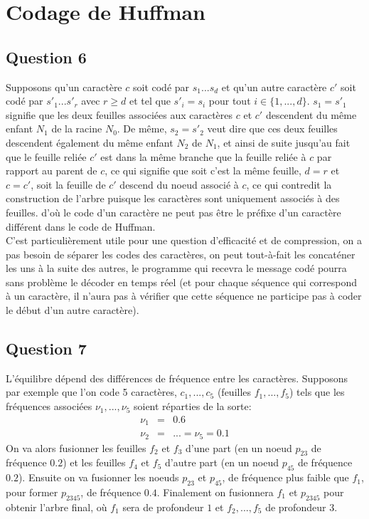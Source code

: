\documentclass{article}
\begin{document}
\section*{Codage de Huffman}
\subsection*{Question 6}
Supposons qu'un caractère $c$ soit codé par $s_1...s_d$ et qu'un autre caractère $c'$ soit codé par $s'_1...s'_r$ avec $r\geq d$ et tel que $s'_i = s_i$ pour tout $i \in \{1, ..., d\}$. $s_1 = s'_1$ signifie que les deux feuilles associées aux caractères $c$ et $c'$ descendent du même enfant $N_1$ de la racine $N_0$. De même, $s_2 = s'_2$ veut dire que ces deux feuilles descendent également du même enfant $N_2$ de $N_1$, et ainsi de suite jusqu'au fait que le feuille reliée $c'$ est dans la même branche que la feuille reliée à $c$ par rapport au parent de $c$, ce qui signifie que soit c'est la même feuille, $d=r$ et $c=c'$, soit la feuille de $c'$ descend du noeud associé à $c$, ce qui contredit la construction de l'arbre puisque les caractères sont uniquement associés à des feuilles. d'où le code d'un caractère ne peut pas être le préfixe d'un caractère différent dans le code de Huffman.\\
C'est particulièrement utile pour une question d'efficacité et de compression, on a pas besoin de séparer les codes des caractères, on peut tout-à-fait les concaténer les uns à la suite des autres, le programme qui recevra le message codé pourra sans problème le décoder en temps réel (et pour chaque séquence qui correspond à un caractère, il n'aura pas à vérifier que cette séquence ne participe pas à coder le début d'un autre caractère).

\subsection*{Question 7}
L'équilibre dépend des différences de fréquence entre les caractères. Supposons par exemple que l'on code 5 caractères, $c_1, ..., c_5$ (feuilles $f_1,...,f_5$) tels que les fréquences associées $\nu_1,..., \nu_5$ soient réparties de la sorte: 
\begin{eqnarray*}
\nu_1 &=& 0.6 \\
\nu_2 &=& ... = \nu_5 = 0.1
\end{eqnarray*}
On va alors fusionner les feuilles $f_2$ et $f_3$ d'une part (en un noeud $p_{23}$ de fréquence $0.2$) et les feuilles $f_4$ et $f_5$ d'autre part (en un noeud $p_{45}$ de fréquence $0.2$).
Ensuite on va fusionner les noeuds $p_{23}$ et $p_{45}$, de fréquence plus faible que $f_1$, pour former $p_{2345}$, de fréquence $0.4$. Finalement on fusionnera $f_1$ et $
p_{2345}$ pour obtenir l'arbre final, où $f_1$ sera de profondeur $1$ et $f_2,...,f_5$ de profondeur $3$. 
\end{document}
